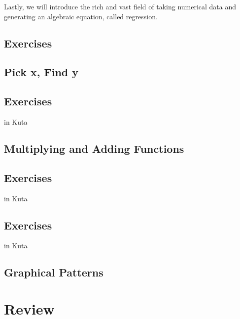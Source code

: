 Lastly, we will introduce the rich and vast field of taking numerical data and generating
an algebraic equation, called regression.  


\newpage
{}
\newpage

\newpage
\subsection{Exercises}



\newpage
{}
\subsection{Pick x, Find y}
\newpage

\newpage
\subsection{Exercises}
in Kuta
~\vfill


\newpage
{}
\subsection{Multiplying and Adding Functions}
{}
\newpage

\newpage
\subsection{Exercises}
in Kuta
~\vfill


\newpage
{}%
\newpage

\newpage
\subsection{Exercises}
in Kuta


\newpage
{}
\subsection{Graphical Patterns}
\newpage
{}

\newpage





\newpage
\section{Review}

